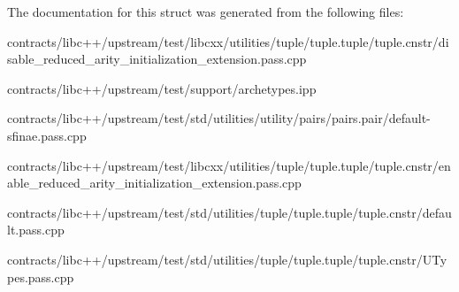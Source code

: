 The documentation for this struct was generated from the following files\+:\begin{DoxyCompactItemize}
\item 
contracts/libc++/upstream/test/libcxx/utilities/tuple/tuple.\+tuple/tuple.\+cnstr/disable\+\_\+reduced\+\_\+arity\+\_\+initialization\+\_\+extension.\+pass.\+cpp\item 
contracts/libc++/upstream/test/support/archetypes.\+ipp\item 
contracts/libc++/upstream/test/std/utilities/utility/pairs/pairs.\+pair/default-\/sfinae.\+pass.\+cpp\item 
contracts/libc++/upstream/test/libcxx/utilities/tuple/tuple.\+tuple/tuple.\+cnstr/enable\+\_\+reduced\+\_\+arity\+\_\+initialization\+\_\+extension.\+pass.\+cpp\item 
contracts/libc++/upstream/test/std/utilities/tuple/tuple.\+tuple/tuple.\+cnstr/default.\+pass.\+cpp\item 
contracts/libc++/upstream/test/std/utilities/tuple/tuple.\+tuple/tuple.\+cnstr/U\+Types.\+pass.\+cpp\end{DoxyCompactItemize}
